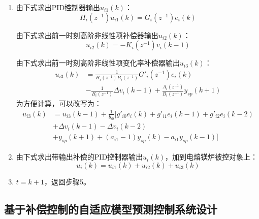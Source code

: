 \documentclass[UTF8, 12pt]{article}
\begin{document}
\begin{enumerate}
	\item 由下式求出PID控制器输出$u_{i1}(k)$：
	\begin{equation*}
		H_i(z^{-1})u_{i1}(k) = G_i(z^{-1})e_i(k)
	\end{equation*}
	
	由下式求出前一时刻高阶非线性项补偿器输出$u_{i2}(k)$：
	\begin{equation*}
		u_{i2}(k) = -K_i(z^{-1})v_i(k-1)
	\end{equation*}
	
	由下式求出前一时刻高阶非线性项变化率补偿器输出$u_{i3}(k)$：
	\begin{align*}
		u_{i3}(k) &= \frac{1}{H_i(z^{-1})B_i(z^{-1})}G'_i(z^{-1})e_i(k)  \\
		& - \frac{1}{B_i(z^{-1})}\Delta v_i(k-1) + \frac{A_i(z^{-1})}{B_i(z^{-1})}y_{sp}(k+1)
	\end{align*}
	为方便计算，可以改写为：
	\begin{align*}
		u_{i3}(k) &= u_{i3}(k-1) + \frac{1}{b_{i0}}[g'_{i0}e_i(k) + g'_{i1}e_i(k-1) + g'_{i2}e_i(k-2) \\
		& + \Delta v_i(k-1) - \Delta v_i(k-2) \\
		& + y_{sp}(k+1) + (a_{i1} - 1)y_{sp}(k) - a_{i1}y_{sp}(k-1)]
	\end{align*}

	\item 由下式求出带输出补偿的PID控制器输出$u_i(k)$，加到电熔镁炉被控对象上：
	\begin{equation*}
		u_i(k) = u_{i1}(k) + u_{i2}(k) + u_{i3}(k)
	\end{equation*}

	\item $t = k+1$，返回步骤5。
\end{enumerate}


\subsection{基于补偿控制的自适应模型预测控制系统设计}
\end{document}
